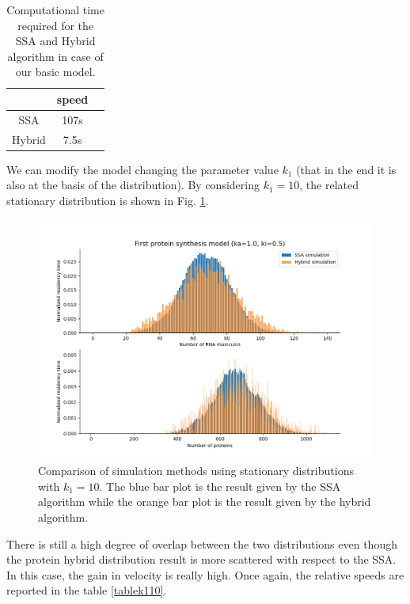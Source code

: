 \documentclass[12pt,a4paper]{report}
\begin{document}
\begin{table}[!h]
\begin{center}
\begin{tabular}{ |c|c|c| } 
 \hline
       & \textbf{speed} \\
 \hline
 SSA & 107s \\
 \hline
 Hybrid & 7.5s \\ 
 \hline
\end{tabular}
\caption{\label{tablebasicmodel}Computational time required for the SSA and Hybrid algorithm in case of our basic model.}
\end{center}
\end{table}
\newpage

We can modify the model changing the parameter value $k_{1}$ (that in the end it is also at the basis of the distribution). By considering $k_{1}=10$, the related stationary distribution is shown in Fig. \ref{SSAHybridk110}.   

\begin{figure}[!ht]
\centering
\includegraphics[scale=0.70]{ka1ki0.5SSA11min58sHybrid7.7stimelimit14000k110.png}
\caption{Comparison of simulation methods using stationary distributions with $k_{1}=10$. The blue bar plot is the result given by the SSA algorithm while the orange bar plot is the result given by the hybrid algorithm.}
\label{SSAHybridk110}
\end{figure}
\newpage
There is still a high degree of overlap between the two distributions even though the protein hybrid distribution result is more scattered with respect to the SSA. In this case, the gain in velocity is really high. Once again, the relative speeds are reported in the table \ref{tablek110}.
\end{document}
